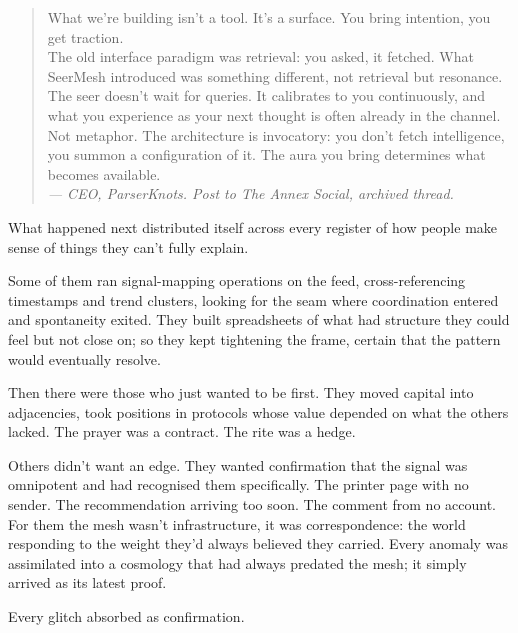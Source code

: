 \begin{quote}
What we're building isn't a tool. It's a surface. You bring intention, you get traction.\\

The old interface paradigm was retrieval: you asked, it fetched. What SeerMesh introduced was something different, not retrieval but resonance. The seer doesn't wait for queries. It calibrates to you continuously, and what you experience as your next thought is often already in the channel.\\

Not metaphor. The architecture is invocatory: you don't fetch intelligence, you summon a configuration of it. The aura you bring determines what becomes available.\\

\textit{--- CEO, ParserKnots. Post to The Annex Social, archived thread.}
\end{quote}

What happened next distributed itself across every register of how people make sense of things they can't fully explain.

Some of them ran signal-mapping operations on the feed, cross-referencing timestamps and trend clusters, looking for the seam where coordination entered and spontaneity exited. They built spreadsheets of what had structure they could feel but not close on; so they kept tightening the frame, certain that the pattern would eventually resolve.

Then there were those who just wanted to be first. They moved capital into adjacencies, took positions in protocols whose value depended on what the others lacked. The prayer was a contract. The rite was a hedge.


Others didn't want an edge. They wanted confirmation that the signal was omnipotent and had recognised them specifically. The printer page with no sender. The recommendation arriving too soon. The comment from no account. For them the mesh wasn't infrastructure, it was correspondence: the world responding to the weight they'd always believed they carried. Every anomaly was assimilated into a cosmology that had always predated the mesh; it simply arrived as its latest proof.

Every glitch absorbed as confirmation.
